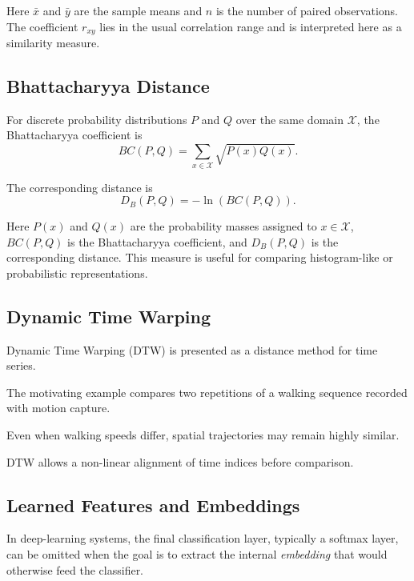 \documentclass[11pt,a4paper,oneside]{report}
\begin{document}
Here \(\bar{x}\) and \(\bar{y}\) are the sample means and \(n\) is the
number of paired observations. The coefficient \(r_{xy}\) lies in the usual
correlation range and is interpreted here as a similarity measure.

\subsection{Bhattacharyya Distance}

For discrete probability distributions \(P\) and \(Q\) over the same
domain \(\mathcal{X}\), the Bhattacharyya coefficient is
\begin{equation}
BC(P,Q)
=
\sum_{x\in\mathcal{X}}
\sqrt{P(x)Q(x)}.
\label{eq:bhattacharyya-coeff}
\end{equation}

The corresponding distance is
\begin{equation}
D_B(P,Q)
=
-\ln\left(BC(P,Q)\right).
\label{eq:bhattacharyya}
\end{equation}

Here \(P(x)\) and \(Q(x)\) are the probability masses assigned to
\(x\in\mathcal{X}\), \(BC(P,Q)\) is the Bhattacharyya coefficient, and
\(D_B(P,Q)\) is the corresponding distance. This measure is useful for
comparing histogram-like or probabilistic representations.

\subsection{Dynamic Time Warping}

Dynamic Time Warping (DTW) is presented as a distance method for time
series.

The motivating example compares two repetitions of a walking sequence
recorded with motion capture.

Even when walking speeds differ, spatial trajectories may remain highly
similar.

DTW allows a non-linear alignment of time indices before comparison.

\subsection{Learned Features and Embeddings}

In deep-learning systems, the final classification layer, typically a softmax layer, can be omitted when the goal is to extract the internal \emph{embedding} that would otherwise feed the classifier.
\end{document}
